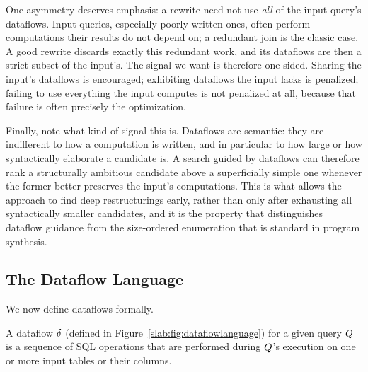 One asymmetry deserves emphasis: a rewrite need not use \emph{all} of
the input query's dataflows. Input queries, especially poorly written
ones, often perform computations their results do not depend on; a
redundant join is the classic case. A good rewrite discards exactly
this redundant work, and its dataflows are then a strict subset of the
input's. The signal we want is therefore one-sided. Sharing the
input's dataflows is encouraged; exhibiting dataflows the input lacks
is penalized; failing to use everything the input computes is not
penalized at all, because that failure is often precisely the
optimization.

Finally, note what kind of signal this is. Dataflows are semantic:
they are indifferent to how a computation is written, and in
particular to how large or how syntactically elaborate a candidate is.
A search guided by dataflows can therefore rank a structurally
ambitious candidate above a superficially simple one whenever the
former better preserves the input's computations. This is what allows
the approach to find deep restructurings early, rather than only after
exhausting all syntactically smaller candidates, and it is the
property that distinguishes dataflow guidance from the size-ordered
enumeration that is standard in program synthesis.

\subsection{The Dataflow Language}
\label{slab:sec:dataflow:language}

We now define dataflows formally.

\begin{definition}[Dataflow]
A dataflow $\delta$ (defined in Figure~\ref{slab:fig:dataflowlanguage}) for a given query $Q$ is a sequence of SQL operations that are performed during $Q$'s execution on one or more input tables or their columns.
\end{definition}

